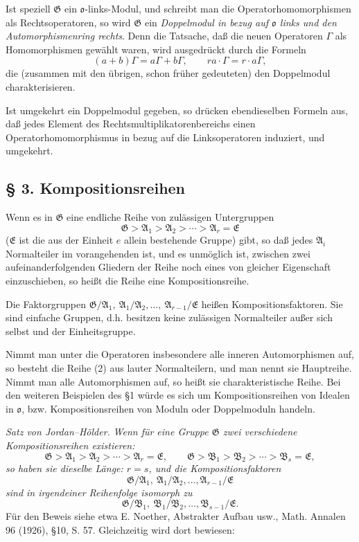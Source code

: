 \documentclass[11pt]{article}
\providecommand{\mG}{\mathfrak{G}}
\providecommand{\mA}{\mathfrak{A}}
\providecommand{\mB}{\mathfrak{B}}
\providecommand{\mE}{\mathfrak{E}}
\providecommand{\mo}{\mathfrak{o}}
\begin{document}
Ist speziell $\mG$ ein $\mo$-links-Modul, und schreibt man die Operatorhomomorphismen als Rechtsoperatoren, so wird $\mG$ ein \emph{Doppelmodul in bezug auf $\mo$ links und den Automorphismenring rechts}. Denn die Tatsache, daß die neuen Operatoren $\Gamma$ als Homomorphismen gewählt waren, wird ausgedrückt durch die Formeln
\[
        (a+b)\Gamma=a\Gamma+b\Gamma,
        \qquad ra\cdot\Gamma=r\cdot a\Gamma,
\]
die (zusammen mit den übrigen, schon früher gedeuteten) den Doppelmodul charakterisieren.

Ist umgekehrt ein Doppelmodul gegeben, so drücken ebendieselben Formeln aus, daß jedes Element des Rechtsmultiplikatorenbereichs einen Operatorhomomorphismus in bezug auf die Linksoperatoren induziert, und umgekehrt.

\subsection*{§ 3. Kompositionsreihen}

Wenn es in $\mG$ eine endliche Reihe von zulässigen Untergruppen
\[
        \mG>\mA_1>\mA_2>\cdots>\mA_r=\mE \tag{2}
\]
($\mE$ ist die aus der Einheit $e$ allein bestehende Gruppe) gibt, so daß jedes $\mA_i$ Normalteiler im vorangehenden ist, und es unmöglich ist, zwischen zwei aufeinanderfolgenden Gliedern der Reihe noch eines von gleicher Eigenschaft einzuschieben, so heißt die Reihe eine Kompositionsreihe.

Die Faktorgruppen $\mG/\mA_1,\ \mA_1/\mA_2,\ldots,\ \mA_{r-1}/\mE$ heißen Kompositionsfaktoren. Sie sind einfache Gruppen, d.h. besitzen keine zulässigen Normalteiler außer sich selbst und der Einheitsgruppe.

Nimmt man unter die Operatoren insbesondere alle inneren Automorphismen auf, so besteht die Reihe (2) aus lauter Normalteilern, und man nennt sie Hauptreihe. Nimmt man alle Automorphismen auf, so heißt sie charakteristische Reihe. Bei den weiteren Beispielen des §1 würde es sich um Kompositionsreihen von Idealen in $\mo$, bzw. Kompositionsreihen von Moduln oder Doppelmoduln handeln.

\emph{Satz von Jordan--Hölder.} \emph{Wenn für eine Gruppe $\mG$ zwei verschiedene Kompositionsreihen existieren:}
\[
        \mG>\mA_1>\mA_2>\cdots>\mA_r=\mE,
        \qquad
        \mG>\mB_1>\mB_2>\cdots>\mB_s=\mE,
\]
\emph{so haben sie dieselbe Länge: $r=s$, und die Kompositionsfaktoren}
\[
        \mG/\mA_1,\ \mA_1/\mA_2,\ldots,\mA_{r-1}/\mE
\]
\emph{sind in irgendeiner Reihenfolge isomorph zu}
\[
        \mG/\mB_1,\ \mB_1/\mB_2,\ldots,\mB_{s-1}/\mE.
\]
Für den Beweis siehe etwa E. Noether, Abstrakter Aufbau usw., Math. Annalen 96 (1926), §10, S. 57. Gleichzeitig wird dort bewiesen:
\end{document}
